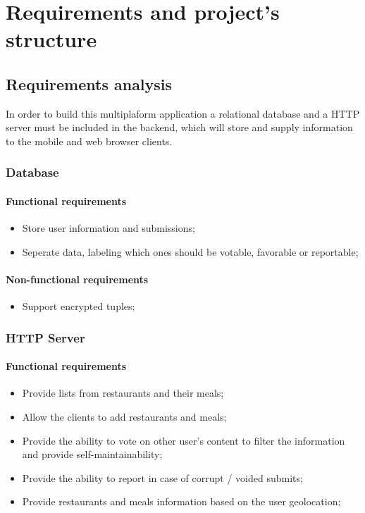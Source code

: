 %
%

\chapter{Requirements and project's structure}

\section{Requirements analysis}

In order to build this multiplaform application a relational database and a HTTP server must be included
in the backend, which will store and supply information to the mobile and web browser clients.

\subsection{Database}

\subsubsection{Functional requirements}

\begin{itemize}
    \item Store user information and submissions;
    \item Seperate data, labeling which ones should be votable, favorable or reportable;
\end{itemize}

\subsubsection{Non-functional requirements}

\begin{itemize}
    \item Support encrypted tuples;
\end{itemize}

\subsection{HTTP Server}

\subsubsection{Functional requirements}

\begin{itemize}
    \item Provide lists from restaurants and their meals;
    \item Allow the clients to add restaurants and meals;
    \item Provide the ability to vote on other user's content to filter the information and provide self-maintainability;
    \item Provide the ability to report in case of corrupt / voided submits;
    \item Provide restaurants and meals information based on the user geolocation;
\end{itemize}

